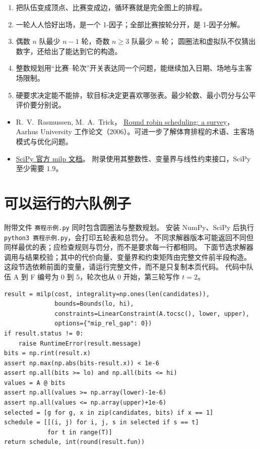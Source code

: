 \documentclass[UTF8,11pt,fontset=none]{ctexart}
\begin{document}
\begin{keybox}
\begin{enumerate}
\item 把队伍变成顶点、比赛变成边，循环赛就是完全图上的排程。
\item 一轮人人恰好出场，是一个 1-因子；全部比赛按轮分开，是 1-因子分解。
\item 偶数 $n$ 队最少 $n-1$ 轮，奇数 $n\ge3$ 队最少 $n$ 轮；
圆圈法和虚拟队不仅猜出数字，还给出了能达到它的构造。
\item 整数规划用“比赛--轮次”开关表达同一个问题，能继续加入日期、场地与主客场限制。
\item 硬要求决定能不能排，软目标决定更喜欢哪张表。最少轮数、最小罚分与公平评价要分别说。
\end{enumerate}
\end{keybox}

\begin{keybox}[参考与继续阅读]
\begin{itemize}
\item R.~V.~Rasmussen, M.~A.~Trick，
\href{https://data.math.au.dk/publications/wp/2006/imf-wp-2006-02.pdf}{Round robin scheduling: a survey}，
Aarhus University 工作论文（2006）。可进一步了解体育排程的术语、主客场模式与优化问题。
\item \href{https://docs.scipy.org/doc/scipy/reference/generated/scipy.optimize.milp.html}{SciPy 官方 milp 文档}。
附录使用其整数性、变量界与线性约束接口，SciPy 至少需要 $1.9$。
\end{itemize}
\end{keybox}

\appendix
\section{可以运行的六队例子}
附带文件 \texttt{赛程示例.py} 同时包含圆圈法与整数规划。
安装 NumPy、SciPy 后执行 \texttt{python3 赛程示例.py}，会打印五轮表和总罚分。
不同求解器版本可能返回不同但同样最优的表；应检查规则与罚分，而不是要求每一行都相同。
下面节选求解器调用与结果校验；其中的代价向量、变量界和约束矩阵由完整文件前半段构造。
这段节选依赖前面的变量，请运行完整文件，而不是只复制本页代码。
代码中队伍 A 到 F 编号为 $0$ 到 $5$，轮次也从 $0$ 开始，第三轮写作 $t=2$。
\begin{lstlisting}
result = milp(cost, integrality=np.ones(len(candidates)),
              bounds=Bounds(lo, hi),
              constraints=LinearConstraint(A.tocsc(), lower, upper),
              options={"mip_rel_gap": 0})
if result.status != 0:
    raise RuntimeError(result.message)
bits = np.rint(result.x)
assert np.max(np.abs(bits-result.x)) < 1e-6
assert np.all(bits >= lo) and np.all(bits <= hi)
values = A @ bits
assert np.all(values >= np.array(lower)-1e-6)
assert np.all(values <= np.array(upper)+1e-6)
selected = [g for g, x in zip(candidates, bits) if x == 1]
schedule = [[(i, j) for i, j, s in selected if s == t]
            for t in range(T)]
return schedule, int(round(result.fun))
\end{lstlisting}
\end{document}
